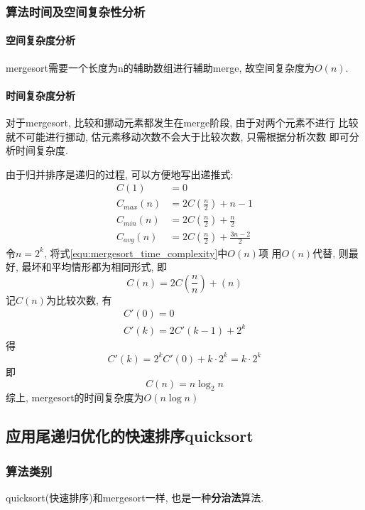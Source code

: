 \subsubsection{算法时间及空间复杂性分析}
\paragraph{空间复杂度分析}
mergesort需要一个长度为n的辅助数组进行辅助merge, 故空间复杂度为$O(n)$.

\paragraph{时间复杂度分析}
对于mergesort, 比较和挪动元素都发生在merge阶段, 由于对两个元素不进行
比较就不可能进行挪动, 估元素移动次数不会大于比较次数, 只需根据分析次数
即可分析时间复杂度. \par
由于归并排序是递归的过程, 可以方便地写出递推式:
\begin{align}
	\label{equ:mergesort_time_complexity}
	C(1)       & = 0                                \nonumber \\
	C_{max}(n) & = 2C(\frac{n}{2}) + n-1            \nonumber \\
	C_{min}(n) & = 2C(\frac{n}{2}) + \frac{n}{2}    \nonumber \\
	C_{avg}(n) & = 2C(\frac{n}{2}) + \frac{3n-2}{2} \nonumber
\end{align}
令\(n=2^k\), 将式\ref{equ:mergesort_time_complexity}中$O(n)$项
用$O(n)$代替, 则最好, 最坏和平均情形都为相同形式, 即
\begin{equation}
	C(n) = 2C(\frac{n}{n})+(n)
\end{equation}
记$C(n)$为比较次数, 有
\begin{gather}
	\label{equ:recursive_equation_derivation}
	C'(0) = 0            \nonumber \\
	C'(k) = 2C'(k-1)+2^k \nonumber
\end{gather}
得
\begin{equation}
	C'(k) = 2^kC'(0)+k\cdot 2^k = k\cdot 2^k \nonumber
\end{equation}
即
\begin{equation}
	C(n) = n\log_2{n} \nonumber
\end{equation}
综上, mergesort的时间复杂度为$O(n\log n)$

\subsection{应用尾递归优化的快速排序quicksort}
\subsubsection{算法类别}
quicksort(快速排序)和mergesort一样, 也是一种\textbf{分治法}算法.

